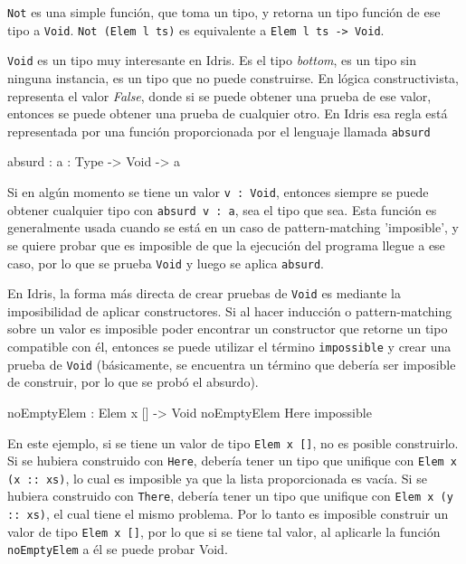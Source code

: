 \texttt{Not} es una simple función, que toma un tipo, y retorna un tipo función de ese tipo a \texttt{Void}. \texttt{Not (Elem l ts)} es equivalente a \texttt{Elem l ts -> Void}.

\texttt{Void} es un tipo muy interesante en Idris. Es el tipo \textit{bottom}, es un tipo sin ninguna instancia, es un tipo que no puede construirse. En lógica constructivista, representa el valor \textit{False}, donde si se puede obtener una prueba de ese valor, entonces se puede obtener una prueba de cualquier otro. En Idris esa regla está representada por una función proporcionada por el lenguaje llamada \texttt{absurd}

\begin{code}
absurd : {a : Type} -> Void -> a
\end{code}

Si en algún momento se tiene un valor \texttt{v : Void}, entonces siempre se puede obtener cualquier tipo con \texttt{absurd v : a}, sea el tipo que sea. Esta función es generalmente usada cuando se está en un caso de pattern-matching 'imposible', y se quiere probar que es imposible de que la ejecución del programa llegue a ese caso, por lo que se prueba \texttt{Void} y luego se aplica \texttt{absurd}.

En Idris, la forma más directa de crear pruebas de \texttt{Void} es mediante la imposibilidad de aplicar constructores. Si al hacer inducción o pattern-matching sobre un valor es imposible poder encontrar un constructor que retorne un tipo compatible con él, entonces se puede utilizar el término \texttt{impossible} y crear una prueba de \texttt{Void} (básicamente, se encuentra un término que debería ser imposible de construir, por lo que se probó el absurdo). 

\begin{code}
noEmptyElem : Elem x [] -> Void
noEmptyElem Here impossible
\end{code}

En este ejemplo, si se tiene un valor de tipo \texttt{Elem x []}, no es posible construirlo. Si se hubiera construido con \texttt{Here}, debería tener un tipo que unifique con \texttt{Elem x (x :: xs)}, lo cual es imposible ya que la lista proporcionada es vacía. Si se hubiera construido con \texttt{There}, debería tener un tipo que unifique con \texttt{Elem x (y :: xs)}, el cual tiene el mismo problema. Por lo tanto es imposible construir un valor de tipo \texttt{Elem x []}, por lo que si se tiene tal valor, al aplicarle la función \texttt{noEmptyElem} a él se puede probar Void.


